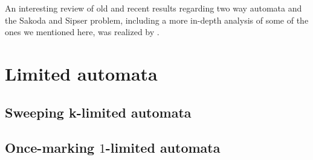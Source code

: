 An interesting review of old and recent results regarding two way automata and the Sakoda and Sipser problem, including a more in-depth analysis of some of the ones we mentioned here, was realized by .


\section{Limited automata}


\subsection{Sweeping k-limited automata}


\subsection{Once-marking \texorpdfstring{$1$}{1}-limited automata}
